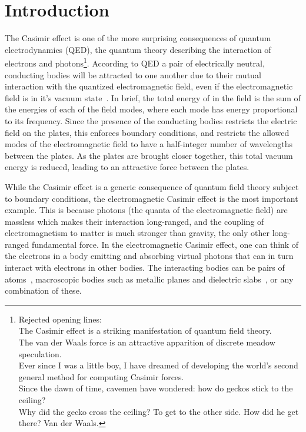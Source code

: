 \chapter{Introduction}
\label{ch:introduction}

The Casimir effect is one of the more surprising consequences of quantum electrodynamics (QED), the quantum theory
describing the interaction of electrons and photons\footnote{
Rejected opening lines: \\
The Casimir effect is a striking manifestation of quantum field theory.\\
The van der Waals force is an attractive apparition of discrete meadow speculation.\\
Ever since I was a little boy, I have dreamed of developing the world's second general method for
computing Casimir forces.\\
Since the dawn of time, cavemen have wondered: how do geckos stick to the ceiling?\\
Why did the gecko cross the ceiling?  To get to the other side.  How did he get there?  Van der Waals.
}.
According to QED a pair of  electrically neutral, conducting bodies will be attracted to one another due to their mutual interaction
with the quantized electromagnetic field, even if the electromagnetic field is in it's vacuum state~\cite{Casimir1948}.  
In brief, the total energy of in the field is the sum of the energies of each of the field modes, 
where each mode has energy proportional to its frequency.   
Since the presence of the conducting bodies restricts the electric field on the plates, this enforces 
boundary conditions, and restricts the allowed modes of the electromagnetic field to have a half-integer 
number of wavelengths between the plates.  
As the plates are brought closer together, this total vacuum energy is reduced, leading to an attractive force
between the plates.  

While the Casimir effect is a generic consequence of quantum field theory subject to boundary conditions,
the electromagnetic Casimir effect is the most important example.  
This is because photons (the quanta of the electromagnetic field) are massless which makes their interaction long-ranged, 
and the coupling of electromagnetism to matter is much stronger than gravity, the only other long-ranged fundamental force.  
In the electromagnetic Casimir effect, one can think of the electrons in a body emitting and absorbing virtual photons that can in turn
interact with electrons in other bodies. %
The interacting bodies can be pairs of atoms~\cite{CasimirPolder1948}, 
macroscopic bodies such as metallic planes and dielectric slabs~\cite{Lifshitz1956}, or any combination of these.

